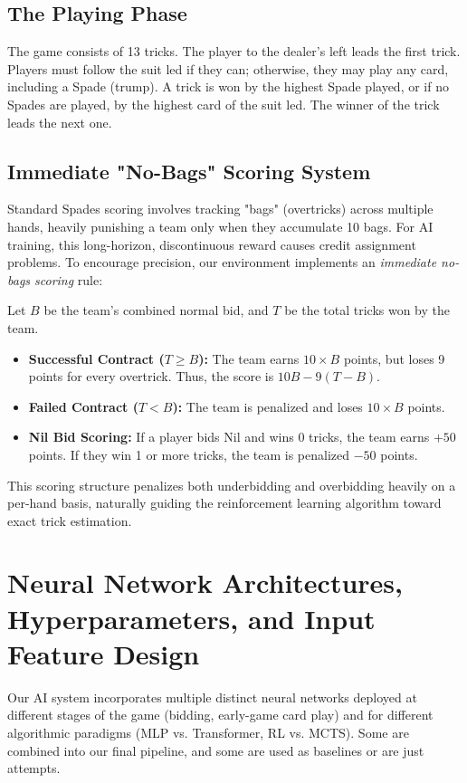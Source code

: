 \documentclass{article}
\begin{document}
\subsection{The Playing Phase}
The game consists of 13 tricks. The player to the dealer's left leads the first trick. Players must follow the suit led if they can; otherwise, they may play any card, including a Spade (trump). A trick is won by the highest Spade played, or if no Spades are played, by the highest card of the suit led. The winner of the trick leads the next one.

\subsection{Immediate "No-Bags" Scoring System}
Standard Spades scoring involves tracking "bags" (overtricks) across multiple hands, heavily punishing a team only when they accumulate 10 bags. For AI training, this long-horizon, discontinuous reward causes credit assignment problems. To encourage precision, our environment implements an \textit{immediate no-bags scoring} rule:

Let $B$ be the team's combined normal bid, and $T$ be the total tricks won by the team.
\begin{itemize}
    \item \textbf{Successful Contract ($T \geq B$):} The team earns $10 \times B$ points, but loses 9 points for every overtrick. Thus, the score is $10B - 9(T - B)$.
    \item \textbf{Failed Contract ($T < B$):} The team is penalized and loses $10 \times B$ points.
    \item \textbf{Nil Bid Scoring:} If a player bids Nil and wins 0 tricks, the team earns $+50$ points. If they win 1 or more tricks, the team is penalized $-50$ points.
\end{itemize}
This scoring structure penalizes both underbidding and overbidding heavily on a per-hand basis, naturally guiding the reinforcement learning algorithm toward exact trick estimation.

\section{Neural Network Architectures, Hyperparameters, and Input Feature Design}
\label{app:hyperparams_and_features}

Our AI system incorporates multiple distinct neural networks deployed at different stages of the game (bidding, early-game card play) and for different algorithmic paradigms (MLP vs. Transformer, RL vs. MCTS). Some are combined into our final pipeline, and some are used as baselines or are just attempts.
\end{document}
